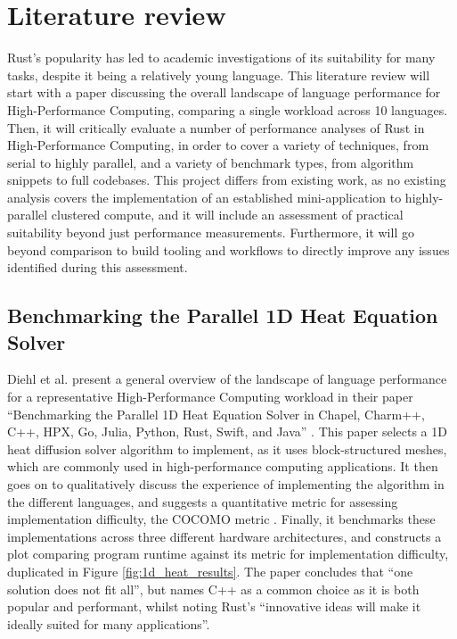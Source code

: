 \section{Literature review}
\label{sec:literature-review}

Rust's popularity has led to academic investigations of its suitability for many tasks, despite it being a relatively young language. This literature review will start with a paper discussing the overall landscape of language performance for High-Performance Computing, comparing a single workload across 10 languages. Then, it will critically evaluate a number of performance analyses of Rust in High-Performance Computing, in order to cover a variety of techniques, from serial to highly parallel, and a variety of benchmark types, from algorithm snippets to full codebases. This project differs from existing work, as no existing analysis covers the implementation of an established mini-application to highly-parallel clustered compute, and it will include an assessment of practical suitability beyond just performance measurements. Furthermore, it will go beyond comparison to build tooling and workflows to directly improve any issues identified during this assessment.

\subsection{Benchmarking the Parallel 1D Heat Equation Solver}
\label{ssec:diehl-et-al}

Diehl et al. present a general overview of the landscape of language performance for a representative High-Performance Computing workload in their paper ``Benchmarking the Parallel 1D Heat Equation Solver in Chapel, Charm++, C++, HPX, Go, Julia, Python, Rust, Swift, and Java'' \cite{diehlBenchmarkingParallel1D2023}. This paper selects a 1D heat diffusion solver algorithm to implement, as it uses block-structured meshes, which are commonly used in high-performance computing applications. It then goes on to qualitatively discuss the experience of implementing the algorithm in the different languages, and suggests a quantitative metric for assessing implementation difficulty, the COCOMO metric \cite{boehm1995cost}. Finally, it benchmarks these implementations across three different hardware architectures, and constructs a plot comparing program runtime against its metric for implementation difficulty, duplicated in Figure \ref{fig:1d_heat_results}. The paper concludes that ``one solution does not fit all'', but names C++ as a common choice as it is both popular and performant, whilst noting Rust's ``innovative ideas will make it ideally suited for many applications''.

